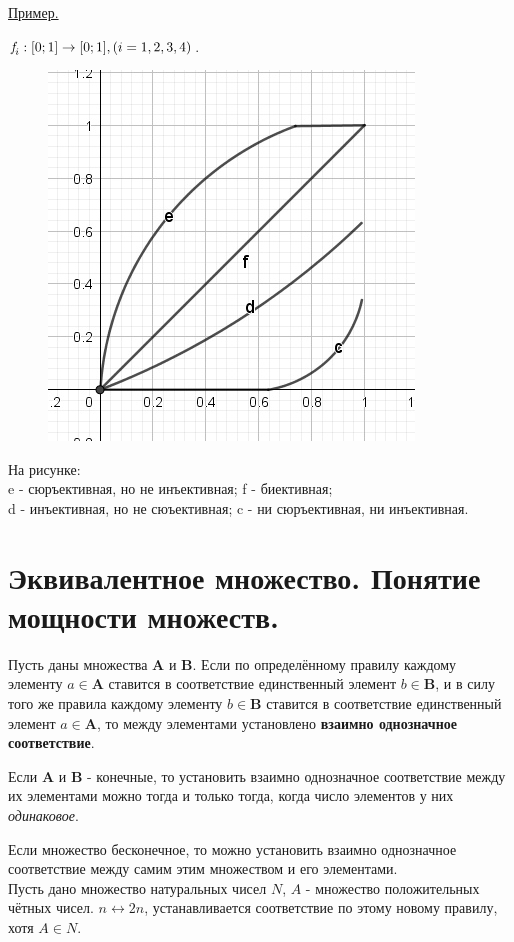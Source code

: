\documentclass[12pt, a4paper, oneside]{article}
\theoremstyle{plain} %
\theoremstyle{definition}
\newcommand{\indef}[1]{\textbf{ \color{dark_red} #1}}
\begin{document}
\underline{Пример.}

$\emph{f}_i: [0;1] \rightarrow [0;1], (i = 1,2,3,4)$.
\begin{figure}[h!]
    \centering
    \includegraphics[width=0.2\textheight]{yurineprav.jpg}
    \label{fig:my_label}
\end{figure}

На рисунке:\\
e - сюръективная, но не инъективная;
f - биективная;\\
d - инъективная, но не сюъективная;
c - ни сюръективная, ни инъективная.

\section{Эквивалентное множество. Понятие мощности множеств.}

Пусть даны множества \textbf{A} и \textbf{B}. Если по определённому правилу каждому элементу $a \in \textbf{A}$ ставится в соответствие единственный элемент $b \in \textbf{B}$, и в силу того же правила каждому элементу $b \in \textbf{B}$ ставится в соответствие единственный элемент $a \in \textbf{A}$, то между элементами установлено \indef{взаимно однозначное соответствие}.\par

Если \textbf{A} и \textbf{B} - конечные, то установить взаимно однозначное соответствие между их элементами можно тогда и только тогда, когда число элементов у них \emph{одинаковое}.\par 

Если множество бесконечное, то можно установить взаимно однозначное соответствие между самим этим множеством и его элементами.\\
Пусть дано множество натуральных чисел $N$, $A$ - множество положительных чётных чисел. $n \leftrightarrow 2n$, устанавливается соответствие по этому новому правилу, хотя $A \in N$.
\end{document}

